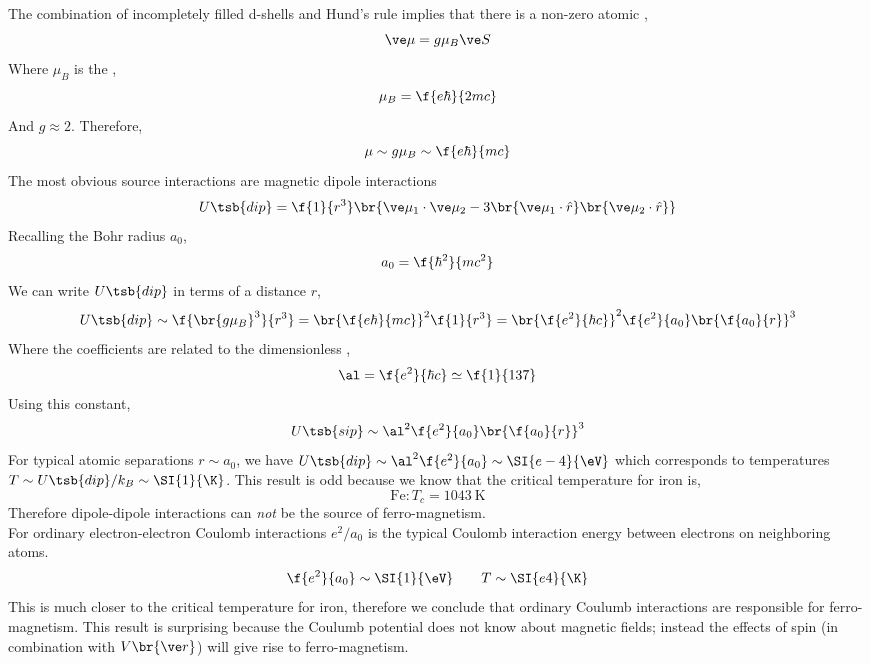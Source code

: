 \documentclass{article}
\begin{document}
The combination of incompletely filled d-shells and Hund's rule implies that there is a non-zero atomic ,
\[ \ve \mu = g \mu_{B} \ve S \]
Where $\mu_B$ is the ,
\[ \mu_{B} = \f{e\hbar}{2 mc} \]
And $g \approx 2$. Therefore,
\[ \mu \sim g \mu_B \sim \f{e\hbar}{mc} \]
The most obvious source interactions are magnetic dipole interactions
\[ U\tsb{dip} = \f{1}{r^3} \br{\ve \mu_1 \cdot \ve \mu_2 - 3 \br{\ve \mu_1 \cdot \hat r}\br{\ve \mu_2 \cdot \hat r}} \]
Recalling the Bohr radius $a_{0}$,
\[ a_{0} = \f{\hbar^2}{m c^2} \]
We can write $U\tsb{dip}$ in terms of a distance $r$,
\[ U\tsb{dip} \sim \f{\br{g\mu_B}^3}{r^3} = \br{\f{e\hbar}{mc}}^2 \f{1}{r^3} = \br{\f{e^2}{\hbar c}}^2 \f{e^2}{a_0} \br{\f{a_0}{r}}^3 \]
Where the coefficients are related to the dimensionless ,
\[ \al = \f{e^2}{\hbar c} \simeq \f{1}{137} \]
Using this constant,
\[ U\tsb{sip} \sim \al^2 \f{e^2}{a_0} \br{\f{a_0}{r}}^3 \]
For typical atomic separations $r \sim a_0$, we have $U\tsb{dip} \sim \al^2 \f{e^2}{a_0} \sim \SI{e-4}{\eV}$ which corresponds to temperatures $T \sim U\tsb{dip}/k_B \sim \SI{1}{\K}$. This result is odd because we know that the critical temperature for iron is,
\[ \text{Fe} : T_c = \SI{1043}{\K} \]
Therefore dipole-dipole interactions can \textit{not} be the source of ferro-magnetism. \\

For ordinary electron-electron Coulomb interactions $e^2 / a_0$ is the typical Coulomb interaction energy between electrons on neighboring atoms.
\[ \f{e^2}{a_0} \sim \SI{1}{\eV} \qquad T \sim \SI{e4}{\K} \]
This is much closer to the critical temperature for iron, therefore we conclude that ordinary Coulumb interactions are responsible for ferro-magnetism. This result is surprising because the Coulumb potential does not know about magnetic fields; instead the effects of spin (in combination with $V\br{\ve r}$) will give rise to ferro-magnetism. \\
\end{document}
